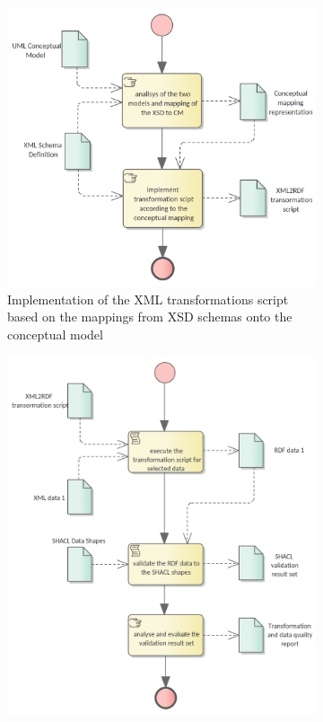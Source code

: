 	\begin{figure}[!ht]
		\centering
		\begin{subfigure}[b]{.48\textwidth}
			\centering
			\includegraphics[width=1.05\linewidth]{../img/xml2rdfScriptCreation.png}
			\caption{Implementation of the XML transformations script based on the mappings from XSD schemas onto the conceptual model}
			\label{fig:sub1}
		\end{subfigure}%
		\quad
		\begin{subfigure}[b]{.48\textwidth}
			\centering
			\includegraphics[width=1.05\linewidth]{../img/xmlDataTransformation.png}

\end{subfigure}
\end{figure}
